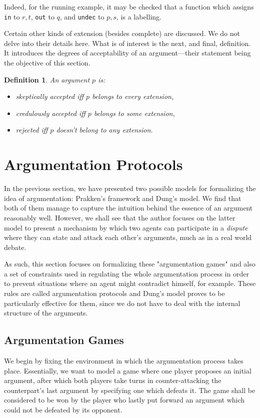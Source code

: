\documentclass[12pt, a4paper]{article}
\newtheorem{Def}{Definition}[subsection]
\begin{document}
Indeed, for the running example, it may be checked that a function which assigns \texttt{in} to $r, t$, \texttt{out} to $q$, and \texttt{undec} to $p, s$, is a labelling.

Certain other kinds of extension (besides complete) are discussed. We do not delve into their details here. What is of interest is the next, and final, definition. It introduces the degrees of acceptability of an argument---their statement being the objective of this section.

\begin{Def}
An argument $p$ is:
\begin{itemize}
\item \emph{skeptically accepted} iff $p$ belongs to every extension,
\item \emph{credulously accepted} iff $p$ belongs to some extension,
\item \emph{rejected} iff $p$ doesn't belong to any extension.
\end{itemize}
\end{Def}

\newpage

\section{Argumentation Protocols}
In the previous section, we have presented two possible models for formalizing the idea of argumentation: Prakken's framework and Dung's model. We find that both of them manage to  capture the intuition behind the essence of an argument reasonably well. However, we shall see that the author focuses on the latter model to present a mechanism by which two agents can participate in a \emph{dispute} where they can state and attack each other's arguments, much as in a real world debate.

As such, this section focuses on formalizing these "argumentation games" and also a set of constraints used in regulating the whole argumentation process in order to prevent situations where an agent might contradict himself, for example. These rules are called argumentation protocols and Dung's model proves to be particularly effective for them, since we do not have to deal with the internal structure of the arguments.

\subsection{Argumentation Games}
We begin by fixing the environment in which the argumentation process takes place. Essentially, we want to model a game where one player proposes an initial argument, after which both players take turns in counter-attacking the counterpart's last argument by specifying one which defeats it. The game shall be considered to be won by the player who lastly put forward an argument which could not be defeated by its opponent.
\end{document}
